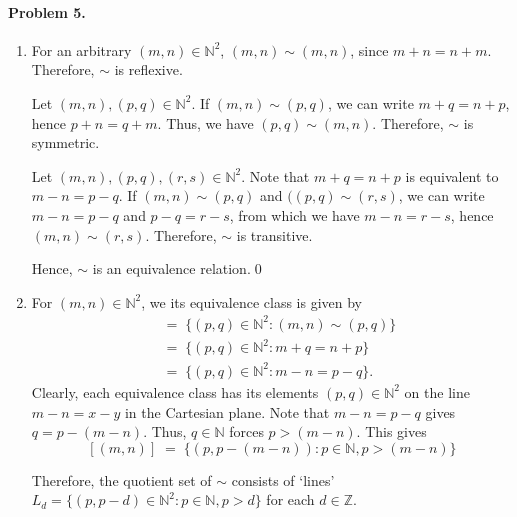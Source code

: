 \documentclass[10pt]{article}
\begin{document}
    \paragraph{Problem 5.}
    \begin{enumerate}
        \item For an arbitrary $(m, n) \in \mathbb{N}^2$, $(m, n)\sim(m, n)$,
        since $m + n = n + m$. Therefore, $\sim$ is reflexive.

        Let $(m, n), (p, q) \in \mathbb{N}^2$. If $(m, n)\sim(p, q)$, we can
        write $m + q = n + p$, hence $p + n = q + m$. Thus, we have $(p,
        q)\sim(m, n)$. Therefore, $\sim$ is symmetric.

        Let $(m, n), (p, q), (r, s) \in \mathbb{N}^2$. Note that $m + q = n +
        p$ is equivalent to $m - n = p - q$. If $(m, n)\sim(p, q)$ and $((p,
        q)\sim(r, s)$, we can write $m - n = p - q$ and $p - q = r - s$, from
        which we have $m - n = r - s$, hence $(m, n)\sim(r, s)$. Therefore,
        $\sim$ is transitive.

        Hence, $\sim$ is an equivalence relation.\qed

        \item For $(m, n) \in \mathbb{N}^2$, we its equivalence class is given
        by \begin{align*}
            [(m, n)]
                \;&=\; \{(p, q) \in \mathbb{N}^2 : (m, n)\sim(p, q)\} \\
                \;&=\; \{(p, q) \in \mathbb{N}^2 : m + q = n + p\} \\
                \;&=\; \{(p, q) \in \mathbb{N}^2 : m - n = p - q\}.
        \end{align*}
        Clearly, each equivalence class has its elements $(p, q) \in
        \mathbb{N}^2$ on the line $m - n = x - y$ in the Cartesian plane.
        Note that $m - n = p - q$ gives $q = p - (m - n)$. Thus, $q \in
        \mathbb{N}$ forces $p > (m - n)$. This gives \[
            [(m, n)] \;=\; \{ (p, p - (m - n)): p \in \mathbb{N}, p > (m - n) \}
        \]

        Therefore, the quotient set of $\sim$ consists of `lines' $L_d = \{(p,
        p - d) \in \mathbb{N}^2 : p \in \mathbb{N}, p > d\}$ for each $d \in
        \mathbb{Z}$.

        \begin{center}
\end{center}
\end{enumerate}
\end{document}
